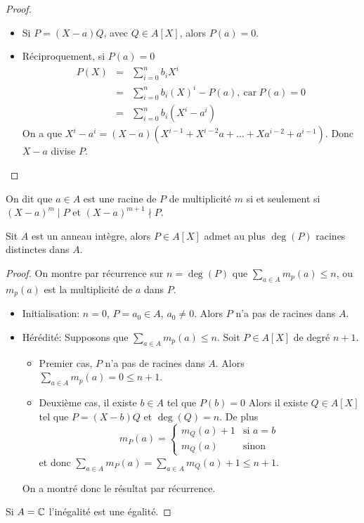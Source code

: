 \begin{proof}
	\begin{itemize}
		\item Si $P = (X-a)Q$, avec $Q \in A[X]$, alors $P(a) = 0$.
		\item Réciproquement, si $P(a) = 0$
		      \begin{eqnarray*}
			      P(X) &=& \sum_{i=0}^n b_iX^i \\
			      &=& \sum_{i=0}^n b_i(X)^i  - P(a), \ \text{car}  \ P(a) = 0 \\
			      &=& \sum_{i=0}^n b_i(X^i-a^i)
		      \end{eqnarray*}
		      On a que $X^i - a^i = (X-a)(X^{i-1} + X^{i-2}a + \dots + Xa^{i-2} + a^{i-1})$. %
		      Donc $X-a$ divise $P$.
	\end{itemize}
\end{proof}

\begin{definition}
	On dit que $a \in A$ est une racine de $P$ de multiplicité $m$ si et seulement si $(X-a)^m \mid P$ et $(X-a)^{m+1} \nmid P$.
\end{definition}

\begin{prop}
	Sit $A$ est un anneau intègre, alors $P \in A[X]$ admet au plus $\deg(P)$ racines distinctes dans $A$.
\end{prop}

\begin{proof}
	On montre par récurrence sur $n = \deg(P)$ que $\sum\limits_{a \in A} m_p(a) \leq n$, ou $m_p(a)$ est la multiplicité de $a$ dans $P$.

	\begin{itemize}
		\item Initialisation: $n = 0$, $P = a_0 \in A$, $a_0 \neq 0$.
		      Alors $P$ n'a pas de racines dans $A$.
		\item Hérédité: Supposons que $\sum\limits_{a \in A} m_p(a) \leq n$. Soit $P \in A[X]$ de degré $n+1$.
		      \begin{itemize}
			      \item Premier cas, $P$ n'a pas de racines dans $A$.
			            Alors $\sum\limits_{a \in A} m_p(a) = 0 \leq n+1$.
			      \item Deuxième cas, il existe $b \in A$ tel que $P(b) = 0$
			            Alors il existe $Q \in A[X]$ tel que $P = (X-b)Q$
			            et $\deg(Q) = n$. De plus
			            $$ m_P(a) = \left\{ \begin{array}{ll}
					            m_Q(a) + 1 & \text{si } a = b \\
					            m_Q(a)     & \text{sinon}
				            \end{array} \right. $$
			            et donc $\sum\limits_{a \in A} m_P(a) = \sum\limits_{a \in A} m_Q(a) + 1 \leq n+1$.
		      \end{itemize}

		      On a montré donc le résultat par récurrence.
	\end{itemize}

	Si $A = \mathbb{C}$ l'inégalité est une égalité.
\end{proof}


